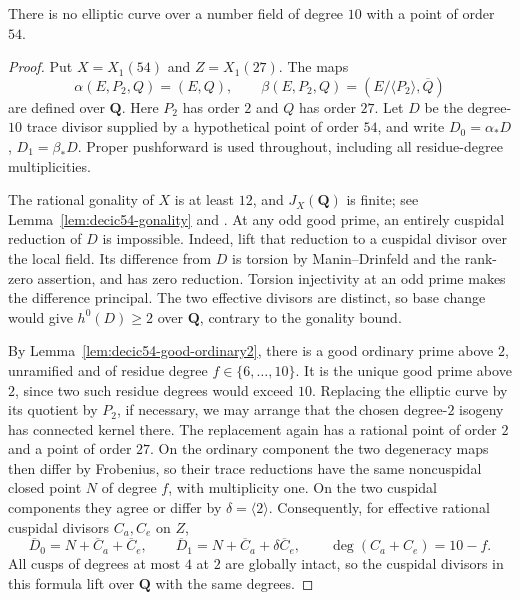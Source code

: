 


\begin{proposition}\label{prop:decic54}
There is no elliptic curve over a number field of degree $10$ with a point
of order $54$.
\end{proposition}
\begin{proof}
Put $X=X_1(54)$ and $Z=X_1(27)$. The maps
\[
 \alpha(E,P_2,Q)=(E,Q),\qquad
 \beta(E,P_2,Q)=(E/\langle P_2\rangle,\overline Q)
\]
are defined over $\mathbf Q$. Here $P_2$ has order $2$ and $Q$ has
order $27$. Let $D$ be the degree-$10$ trace divisor supplied by a
hypothetical point of order $54$, and write
$D_0=\alpha_*D$, $D_1=\beta_*D$. Proper pushforward is used throughout,
including all residue-degree multiplicities.

The rational gonality of $X$ is at least $12$, and $J_X(\mathbf Q)$
is finite; see Lemma~\ref{lem:decic54-gonality} and
\cite[Theorem~3.1(2)]{DEHMZ}. At any odd good prime, an entirely
cuspidal reduction of $D$ is impossible. Indeed, lift that reduction
to a cuspidal divisor over the local field. Its difference from $D$
is torsion by Manin--Drinfeld and the rank-zero assertion, and has
zero reduction. Torsion injectivity at an odd prime makes the
difference principal. The two effective divisors are distinct,
so base change would give $h^0(D)\geq2$ over $\mathbf Q$,
contrary to the gonality bound.

By Lemma~\ref{lem:decic54-good-ordinary2}, there is a good ordinary
prime above $2$, unramified and of residue degree $f\in\{6,\ldots,10\}$.
It is the unique good prime above $2$, since two such residue degrees
would exceed $10$. Replacing the elliptic curve by its quotient by
$P_2$, if necessary, we may arrange that the chosen degree-$2$
isogeny has connected kernel there. The replacement again has a
rational point of order $2$ and a point of order $27$.
On the ordinary component the two degeneracy maps then differ by
Frobenius, so their trace reductions have the same noncuspidal
closed point $N$ of degree $f$, with multiplicity one. On the two
cuspidal components they agree or differ by $\delta=\langle2\rangle$.
Consequently, for effective rational cuspidal divisors $C_a,C_e$ on $Z$,
\[
 \overline D_0=N+\overline C_a+\overline C_e,\qquad
 \overline D_1=N+\overline C_a+\delta\overline C_e,
 \qquad \deg(C_a+C_e)=10-f.                         \tag{54.1}
\]
All cusps of degrees at most $4$ at $2$ are globally intact, so the
cuspidal divisors in this formula lift over $\mathbf Q$ with the
same degrees.


\end{proof}
